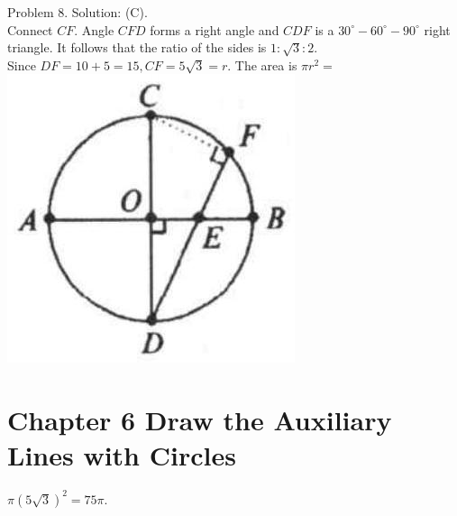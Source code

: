 \documentclass[10pt]{article}
\begin{document}
Problem 8. Solution: (C).\\
Connect \(C F\). Angle \(C F D\) forms a right angle and \(C D F\) is a \(30^{\circ}-60^{\circ}-90^{\circ}\) right triangle. It follows that the ratio of the sides is \(1: \sqrt{3}: 2\).\\
Since \(D F=10+5=15, C F=5 \sqrt{3}=r\). The area is \(\pi r^{2}=\)\\
\includegraphics[max width=\textwidth, center]{2025_04_17_97bc1f7e44d93c271a88g-173(2)}

\section*{Chapter 6 Draw the Auxiliary Lines with Circles}
\(\pi(5 \sqrt{3})^{2}=75 \pi\).
\end{document}

